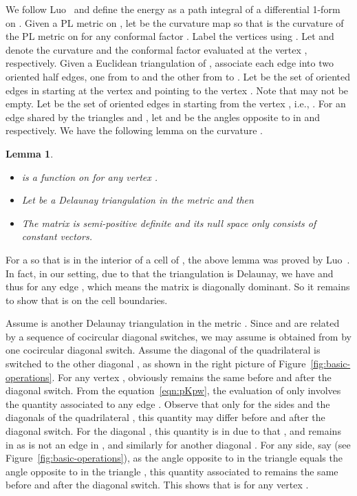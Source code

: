 \documentclass[11pt]{article}
\newtheorem{lemma}[theorem]{Lemma}
\newenvironment{proof}[1][Proof]{\begin{trivlist}
\item[\hskip \labelsep {\bfseries #1}]}{\end{trivlist}}
\begin{document}
We follow Luo~\cite{luo} and define the energy as a path integral of a differential 1-form on . 
Given a PL metric  on , let  be the curvature map
so that  is the curvature of the PL metric  on  for any conformal factor . 
Label the vertices  using . 
Let  and  denote the curvature  and the conformal factor  evaluated at the vertex , respectively.
Given a Euclidean triangulation  of , associate each edge  into two oriented 
half edges, one from  to  and the other from  to . 
Let  be the set of oriented edges in  starting 
at the vertex  and pointing to the vertex . Note that  may not be empty. 
Let  be the set of oriented edges in  starting from the vertex , i.e.,  
. 
For an edge  shared by the triangles  and , let  and  be the angles opposite 
to  in  and  respectively. We have the following lemma on the curvature .  
\begin{lemma}
\begin{itemize}
\item[(i)]  is a  function on  for any vertex . 
\item[(ii)] Let  be a Delaunay triangulation in the metric  and then 

\item[(iii)] The matrix  is semi-positive definite and its null space
 only consists of constant vectors. 
\end{itemize}
\label{lem:pKpw}
\end{lemma}
\begin{proof}
For a  so that  is in the interior of a cell of , the above lemma was proved 
by Luo~\cite{luo}. In fact, in our setting, due to that the triangulation  is Delaunay, we have  
 and thus  for any edge , which means the 
matrix  is diagonally dominant. 
So it remains to show that  is  on the cell boundaries.

Assume  is another Delaunay triangulation in the metric . Since  and  are related by a sequence of 
cocircular diagonal switches, we may assume  is obtained from  by one cocircular diagonal switch. 
Assume the diagonal  of the quadrilateral  is switched to the other diagonal , as shown in 
the right picture of Figure~\ref{fig:basic-operations}. 
For any vertex ,  obviously remains the same before and after the diagonal switch. From the equation~\eqref{eqn:pKpw}, 
the evaluation of  only involves the quantity  
associated to any edge . Observe that only for the sides and the diagonals of the quadrilateral , 
this quantity may differ before and after the diagonal switch. For the diagonal , this quantity is  in  
due to that  , and remains  in  as  is not an edge in , and 
similarly for another diagonal . For any side, say  (see Figure~\ref{fig:basic-operations}), 
as the angle opposite to  in the triangle  equals the angle opposite to  in the triangle , 
this quantity associated to  remains the same before and 
after the diagonal switch. This shows that  is  for any vertex . 
\end{proof}
\end{document}

